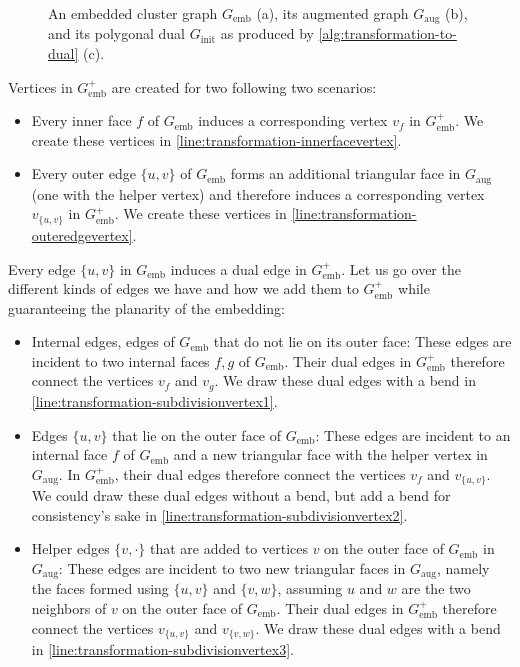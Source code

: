 \begin{figure}[H]
	\caption{An embedded cluster graph $G_\text{emb}$ (a), its augmented graph $G_\text{aug}$ (b), and its polygonal dual $G_\text{init}$ as produced by \cref{alg:transformation-to-dual} (c).}
	\label{fig:transformation-algorithm}
\end{figure}

Vertices in $G_\text{emb}^+$ are created for two following two scenarios:
%
\begin{itemize}
	\item Every inner face $f$ of $G_\text{emb}$ induces a corresponding vertex $v_f$ in $G_\text{emb}^+$. We create these vertices in \cref{line:transformation-innerfacevertex}.
	\item Every outer edge $\{u,v\}$ of $G_\text{emb}$ forms an additional triangular face in $G_\text{aug}$ (one with the helper vertex) and therefore induces a corresponding vertex $v_{\{u,v\}}$ in $G_\text{emb}^+$. We create these vertices in \cref{line:transformation-outeredgevertex}.
\end{itemize}

Every edge $\{u,v\}$ in $G_\text{emb}$ induces a dual edge in $G_\text{emb}^+$. Let us go over the different kinds of edges we have and how we add them to $G_\text{emb}^+$ while guaranteeing the planarity of the embedding:
%
\begin{itemize}
	\item Internal edges, \ie{} edges of $G_\text{emb}$ that do not lie on its outer face: These edges are incident to two internal faces $f, g$ of $G_\text{emb}$. Their dual edges in $G_\text{emb}^+$ therefore connect the vertices $v_f$ and $v_g$. We draw these dual edges with a bend in \cref{line:transformation-subdivisionvertex1}.
	\item Edges $\{u,v\}$ that lie on the outer face of $G_\text{emb}$: These edges are incident to an internal face $f$ of $G_\text{emb}$ and a new triangular face with the helper vertex in $G_\text{aug}$. In $G_\text{emb}^+$, their dual edges therefore connect the vertices $v_f$ and $v_{\{u,v\}}$. We could draw these dual edges without a bend, but add a bend for consistency's sake in \cref{line:transformation-subdivisionvertex2}.
	\item Helper edges $\{v,\cdot\}$ that are added to vertices $v$ on the outer face of $G_\text{emb}$ in $G_\text{aug}$: These edges are incident to two new triangular faces in $G_\text{aug}$, namely the faces formed using $\{u,v\}$ and $\{v,w\}$, assuming $u$ and $w$ are the two neighbors of $v$ on the outer face of $G_\text{emb}$. Their dual edges in $G_\text{emb}^+$ therefore connect the vertices $v_{\{u,v\}}$ and $v_{\{v,w\}}$. We draw these dual edges with a bend in \cref{line:transformation-subdivisionvertex3}.
\end{itemize}

